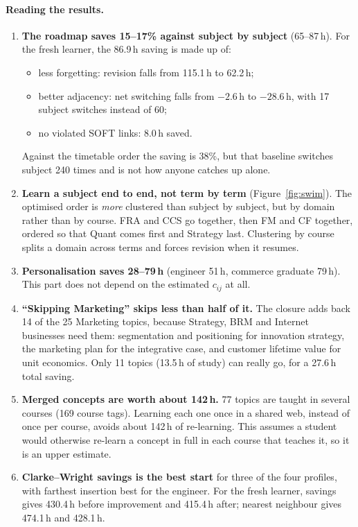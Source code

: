 \documentclass[11pt,a4paper]{article}
\begin{document}
\paragraph{Reading the results.}
\begin{enumerate}[leftmargin=*]
\item \textbf{The roadmap saves 15--17\% against subject by subject} (65--87\,h). For the fresh learner, the 86.9\,h saving is made up of:
\begin{itemize}
\item less forgetting: revision falls from 115.1\,h to 62.2\,h;
\item better adjacency: net switching falls from $-2.6$\,h to $-28.6$\,h, with 17 subject switches instead of 60;
\item no violated SOFT links: 8.0\,h saved.
\end{itemize}
Against the timetable order the saving is 38\%, but that baseline switches subject 240 times and is not how anyone catches up alone.
\item \textbf{Learn a subject end to end, not term by term} (Figure~\ref{fig:swim}). The optimised order is \emph{more} clustered than subject by subject, but by domain rather than by course. FRA and CCS go together, then FM and CF together, ordered so that Quant comes first and Strategy last. Clustering by course splits a domain across terms and forces revision when it resumes.
\item \textbf{Personalisation saves 28--79\,h} (engineer 51\,h, commerce graduate 79\,h). This part does not depend on the estimated $c_{ij}$ at all.
\item \textbf{``Skipping Marketing'' skips less than half of it.} The closure adds back 14 of the 25 Marketing topics, because Strategy, BRM and Internet businesses need them: segmentation and positioning for innovation strategy, the marketing plan for the integrative case, and customer lifetime value for unit economics. Only 11 topics (13.5\,h of study) can really go, for a 27.6\,h total saving.
\item \textbf{Merged concepts are worth about 142\,h.} 77 topics are taught in several courses (169 course tags). Learning each one once in a shared web, instead of once per course, avoids about 142\,h of re-learning. This assumes a student would otherwise re-learn a concept in full in each course that teaches it, so it is an upper estimate.
\item \textbf{Clarke--Wright savings is the best start} for three of the four profiles, with farthest insertion best for the engineer. For the fresh learner, savings gives 430.4\,h before improvement and 415.4\,h after; nearest neighbour gives 474.1\,h and 428.1\,h.
\end{enumerate}
\end{document}
